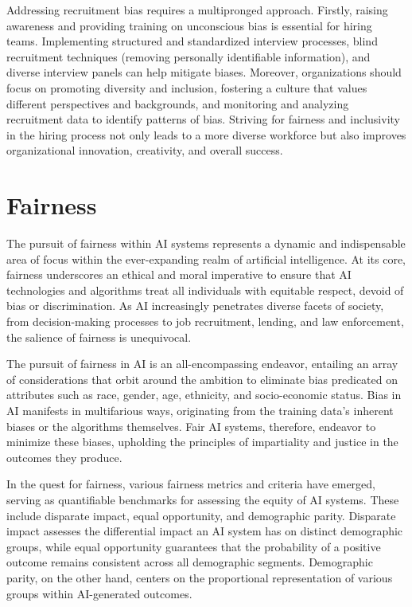 \documentclass[12pt,a4paper,openright,twoside]{book}
\begin{document}
Addressing recruitment bias requires a multipronged approach. Firstly, raising awareness and providing training on unconscious bias is essential for hiring teams. Implementing structured and standardized interview processes, blind recruitment techniques (removing personally identifiable information), and diverse interview panels can help mitigate biases. Moreover, organizations should focus on promoting diversity and inclusion, fostering a culture that values different perspectives and backgrounds, and monitoring and analyzing recruitment data to identify patterns of bias. Striving for fairness and inclusivity in the hiring process not only leads to a more diverse workforce but also improves organizational innovation, creativity, and overall success.

\newpage
\section{Fairness} 

The pursuit of fairness within AI systems represents a dynamic and indispensable area of focus within the ever-expanding realm of artificial intelligence. At its core, fairness underscores an ethical and moral imperative to ensure that AI technologies and algorithms treat all individuals with equitable respect, devoid of bias or discrimination. As AI increasingly penetrates diverse facets of society, from decision-making processes to job recruitment, lending, and law enforcement, the salience of fairness is unequivocal. 

The pursuit of fairness in AI is an all-encompassing endeavor, entailing an array of considerations that orbit around the ambition to eliminate bias predicated on attributes such as race, gender, age, ethnicity, and socio-economic status. Bias in AI manifests in multifarious ways, originating from the training data's inherent biases or the algorithms themselves. Fair AI systems, therefore, endeavor to minimize these biases, upholding the principles of impartiality and justice in the outcomes they produce. 

In the quest for fairness, various fairness metrics and criteria have emerged, serving as quantifiable benchmarks for assessing the equity of AI systems. These include disparate impact, equal opportunity, and demographic parity. Disparate impact assesses the differential impact an AI system has on distinct demographic groups, while equal opportunity guarantees that the probability of a positive outcome remains consistent across all demographic segments. Demographic parity, on the other hand, centers on the proportional representation of various groups within AI-generated outcomes. 
\end{document}
